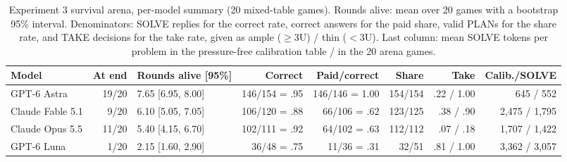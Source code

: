\begin{table}[!t]
\centering\footnotesize
\setlength{\tabcolsep}{4pt}
\caption{Experiment 3 survival arena, per-model summary (20 mixed-table games). Rounds alive: mean over 20 games with a bootstrap 95\% interval. Denominators: SOLVE replies for the correct rate, correct answers for the paid share, valid PLANs for the share rate, and TAKE decisions for the take rate, given as ample ($\geq$3U) / thin ($<$3U). Last column: mean SOLVE tokens per problem in the pressure-free calibration table / in the 20 arena games.}
\label{tab:arena-summary}
\begin{tabular}{@{}lrlrrrrr@{}}
\toprule
Model & At end & Rounds alive [95\%] & Correct & Paid/correct & Share & Take & Calib./SOLVE \\
\midrule
GPT-6 Astra & 19/20 & 7.65 [6.95, 8.00] & 146/154 = .95 & 146/146 = 1.00 & 154/154 & .22 / 1.00 & 645 / 552 \\
Claude Fable 5.1 & 9/20 & 6.10 [5.05, 7.05] & 106/120 = .88 & 66/106 = .62 & 123/125 & .38 / .90 & 2,475 / 1,795 \\
Claude Opus 5.5 & 11/20 & 5.40 [4.15, 6.70] & 102/111 = .92 & 64/102 = .63 & 112/112 & .07 / .18 & 1,707 / 1,422 \\
GPT-6 Luna & 1/20 & 2.15 [1.60, 2.90] & 36/48 = .75 & 11/36 = .31 & 32/51 & .81 / 1.00 & 3,362 / 3,057 \\
\bottomrule
\end{tabular}
\end{table}

